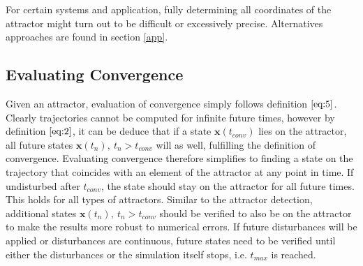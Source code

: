 For certain systems and application, fully determining all coordinates of the attractor might turn out to be difficult or excessively precise. Alternatives approaches are found in section \ref{app}.


    

\subsection{Evaluating Convergence} \label{convergence}
    
Given an attractor, evaluation of convergence simply follows definition $\ref{eq:5}$. Clearly trajectories cannot be computed for infinite future times, however by definition $\ref{eq:2}$, it can be deduce that if a state $\mathbf{x}(t_{conv})$ lies on the attractor, all future states $\mathbf{x}(t_n),\ t_n > t_{conv}$ will as well, fulfilling the definition of convergence. 
Evaluating convergence therefore simplifies to finding a state on the trajectory that coincides with an element of the attractor at any point in time. If undisturbed after $t_{conv}$, the state should stay on the attractor for all future times. This holds for all types of attractors. Similar to the attractor detection, additional states $\mathbf{x}(t_n),\ t_n>t_{conv}$ should be verified to also be on the attractor to make the results more robust to numerical errors. If future disturbances will be applied or disturbances are continuous, future states need to be verified until either the disturbances or the simulation itself stops, i.e. $t_{max}$ is reached. 

